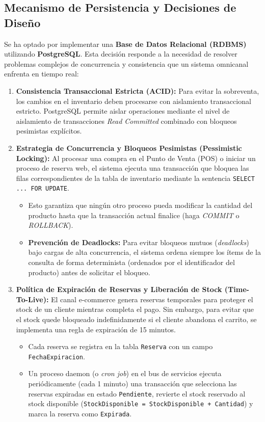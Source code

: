 \documentclass[12pt,a4paper]{article}
\begin{document}
\subsection{Mecanismo de Persistencia y Decisiones de Diseño}
Se ha optado por implementar una \textbf{Base de Datos Relacional (RDBMS)} utilizando \textbf{PostgreSQL}. Esta decisión responde a la necesidad de resolver problemas complejos de concurrencia y consistencia que un sistema omnicanal enfrenta en tiempo real:

\begin{enumerate}
    \item \textbf{Consistencia Transaccional Estricta (ACID):} Para evitar la sobreventa, los cambios en el inventario deben procesarse con aislamiento transaccional estricto. PostgreSQL permite aislar operaciones mediante el nivel de aislamiento de transacciones \textit{Read Committed} combinado con bloqueos pesimistas explícitos.
    
    \item \textbf{Estrategia de Concurrencia y Bloqueos Pesimistas (Pessimistic Locking):} Al procesar una compra en el Punto de Venta (POS) o iniciar un proceso de reserva web, el sistema ejecuta una transacción que bloquea las filas correspondientes de la tabla de inventario mediante la sentencia \texttt{SELECT ... FOR UPDATE}.
    \begin{itemize}
        \item Esto garantiza que ningún otro proceso pueda modificar la cantidad del producto hasta que la transacción actual finalice (haga \textit{COMMIT} o \textit{ROLLBACK}).
        \item \textbf{Prevención de Deadlocks:} Para evitar bloqueos mutuos (\textit{deadlocks}) bajo cargas de alta concurrencia, el sistema ordena siempre los ítems de la consulta de forma determinista (ordenados por el identificador del producto) antes de solicitar el bloqueo.
    \end{itemize}
    
    \item \textbf{Política de Expiración de Reservas y Liberación de Stock (Time-To-Live):} El canal e-commerce genera reservas temporales para proteger el stock de un cliente mientras completa el pago. Sin embargo, para evitar que el stock quede bloqueado indefinidamente si el cliente abandona el carrito, se implementa una regla de expiración de 15 minutos.
    \begin{itemize}
        \item Cada reserva se registra en la tabla \texttt{Reserva} con un campo \texttt{FechaExpiracion}.
        \item Un proceso daemon (o \textit{cron job}) en el bus de servicios ejecuta periódicamente (cada 1 minuto) una transacción que selecciona las reservas expiradas en estado \texttt{Pendiente}, revierte el stock reservado al stock disponible (\texttt{StockDisponible = StockDisponible + Cantidad}) y marca la reserva como \texttt{Expirada}.
    \end{itemize}
    

\end{enumerate}
\end{document}
